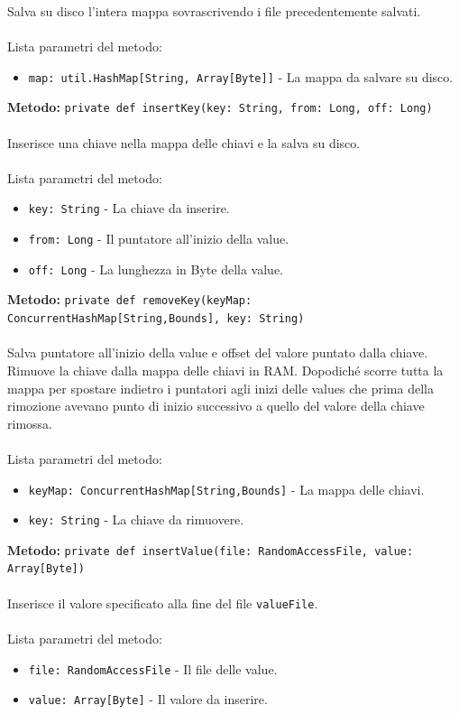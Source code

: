 \documentclass[a4paper]{article}
\begin{document}
		Salva su disco l'intera mappa sovrascrivendo i file precedentemente salvati.
		\\ \\
		Lista parametri del metodo:
		\begin{itemize}
			\item \texttt{map: util.HashMap[String, Array[Byte]]} - La mappa da salvare su disco. 
		\end{itemize}
		\textbf{Metodo:} \texttt{private def insertKey(key: String, from: Long, off: Long)}
		\\ \\
		Inserisce una chiave nella mappa delle chiavi e la salva su disco.
		\\ \\
		Lista parametri del metodo:
		\begin{itemize}
			\item \texttt{key: String} - La chiave da inserire.
			\item \texttt{from: Long} - Il puntatore all'inizio della value.
			\item \texttt{off: Long} - La lunghezza in Byte della value.
		\end{itemize}
		\textbf{Metodo:} \texttt{private def removeKey(keyMap: ConcurrentHashMap[String,Bounds], key: String)}
		\\ \\
		Salva puntatore all'inizio della value e offset del valore puntato dalla chiave. Rimuove la chiave dalla mappa delle chiavi in RAM. Dopodiché scorre tutta la mappa per spostare indietro i puntatori agli inizi delle values che prima della rimozione avevano punto di inizio successivo a quello del valore della chiave rimossa.
		\\ \\
		Lista parametri del metodo:
		\begin{itemize}
			\item \texttt{keyMap: ConcurrentHashMap[String,Bounds]} - La mappa delle chiavi.
			\item \texttt{key: String} - La chiave da rimuovere.
		\end{itemize}
		\textbf{Metodo:} \texttt{private def insertValue(file: RandomAccessFile, value: Array[Byte])}
		\\ \\
		Inserisce il valore specificato alla fine del file \texttt{valueFile}.
		\\ \\
		Lista parametri del metodo:
		\begin{itemize}
			\item \texttt{file: RandomAccessFile} - Il file delle value.
			\item \texttt{value: Array[Byte]} - Il valore da inserire.
		\end{itemize}
\end{document}
